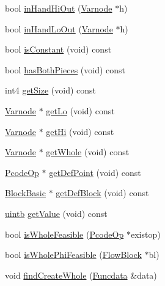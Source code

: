 \begin{DoxyCompactItemize}
\item 
bool \mbox{\hyperlink{class_split_varnode_a5f0c6ee63f23f5ac06c6b38e805289ae}{in\+Hand\+Hi\+Out}} (\mbox{\hyperlink{class_varnode}{Varnode}} $\ast$h)
\item 
bool \mbox{\hyperlink{class_split_varnode_a5c34881b35017222348dd0ba967e7019}{in\+Hand\+Lo\+Out}} (\mbox{\hyperlink{class_varnode}{Varnode}} $\ast$h)
\item 
bool \mbox{\hyperlink{class_split_varnode_aab8d8d52dc075984f318ae17dc6522dd}{is\+Constant}} (void) const
\item 
bool \mbox{\hyperlink{class_split_varnode_a6ac0b1ddf23347d284482e0bb02b00de}{has\+Both\+Pieces}} (void) const
\item 
int4 \mbox{\hyperlink{class_split_varnode_ad3a64fdae20a35ec05c3332612bd45de}{get\+Size}} (void) const
\item 
\mbox{\hyperlink{class_varnode}{Varnode}} $\ast$ \mbox{\hyperlink{class_split_varnode_abed66f1e261a68d2d138f811eb2d2ba0}{get\+Lo}} (void) const
\item 
\mbox{\hyperlink{class_varnode}{Varnode}} $\ast$ \mbox{\hyperlink{class_split_varnode_ac42eae2b9f25ba620f3741661b91f5d6}{get\+Hi}} (void) const
\item 
\mbox{\hyperlink{class_varnode}{Varnode}} $\ast$ \mbox{\hyperlink{class_split_varnode_af26a6359a12ff242114c755a29872246}{get\+Whole}} (void) const
\item 
\mbox{\hyperlink{class_pcode_op}{Pcode\+Op}} $\ast$ \mbox{\hyperlink{class_split_varnode_a41170d0dab7ac87fd947d3585ed7e896}{get\+Def\+Point}} (void) const
\item 
\mbox{\hyperlink{class_block_basic}{Block\+Basic}} $\ast$ \mbox{\hyperlink{class_split_varnode_ad8924f8b19d9c23932ffbee502edc8aa}{get\+Def\+Block}} (void) const
\item 
\mbox{\hyperlink{types_8h_a2db313c5d32a12b01d26ac9b3bca178f}{uintb}} \mbox{\hyperlink{class_split_varnode_a6694bb94e5e2d4ad415b7377c3aa430f}{get\+Value}} (void) const
\item 
bool \mbox{\hyperlink{class_split_varnode_a6a47b2837232b23935419b5e62643991}{is\+Whole\+Feasible}} (\mbox{\hyperlink{class_pcode_op}{Pcode\+Op}} $\ast$existop)
\item 
bool \mbox{\hyperlink{class_split_varnode_a0f6bba38e4adb554ebb69658cf3e3ee7}{is\+Whole\+Phi\+Feasible}} (\mbox{\hyperlink{class_flow_block}{Flow\+Block}} $\ast$bl)
\item 
void \mbox{\hyperlink{class_split_varnode_a957febfb33e3d53592bb677c388384e9}{find\+Create\+Whole}} (\mbox{\hyperlink{class_funcdata}{Funcdata}} \&data)

\end{DoxyCompactItemize}

